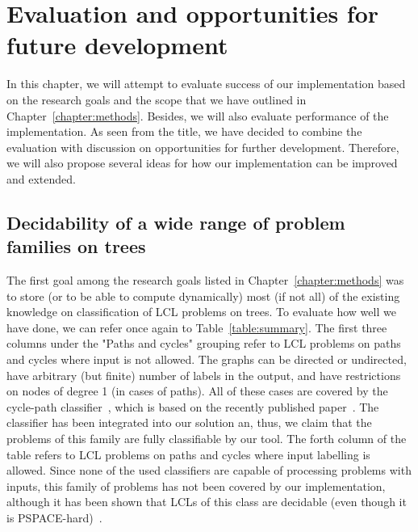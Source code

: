 \chapter{Evaluation and opportunities for future development}
\label{chapter:evaluation}

In this chapter, we will attempt to evaluate success of our implementation
based on the research goals and the scope that we have outlined in Chapter~\ref{chapter:methods}.
Besides, we will also evaluate performance of the implementation. As seen from the title,
we have decided to combine the evaluation with discussion on opportunities for further
development. Therefore, we will also propose several ideas for how our implementation
can be improved and extended.

\section{Decidability of a wide range of problem families on trees}

The first goal among the research goals listed in Chapter~\ref{chapter:methods}
was to store (or to be able to compute dynamically) most
(if not all) of the existing knowledge on classification of LCL problems on trees.
To evaluate how well we have done, we can refer once again to Table~\ref{table:summary}.
The first three columns under the "Paths and cycles" grouping refer to LCL problems on
paths and cycles where input is not allowed. The graphs can be directed or undirected,
have arbitrary (but finite) number of labels in the output, and have restrictions
on nodes of degree 1 (in cases of paths). All of these cases are covered by
the cycle-path classifier~\cite{FIXME}, which is based on the recently
published paper~\cite{FIXME}. The classifier has been integrated into our
solution an, thus, we claim that the problems of this family are fully classifiable by our tool.
The forth column of the table refers to LCL problems on paths and cycles
where input labelling is allowed. Since none of the used classifiers
are capable of processing problems with inputs, this family of problems
has not been covered by our implementation, although it has been shown that
LCLs of this class are decidable (even though it is PSPACE-hard)~\cite{Balliu2018}.

